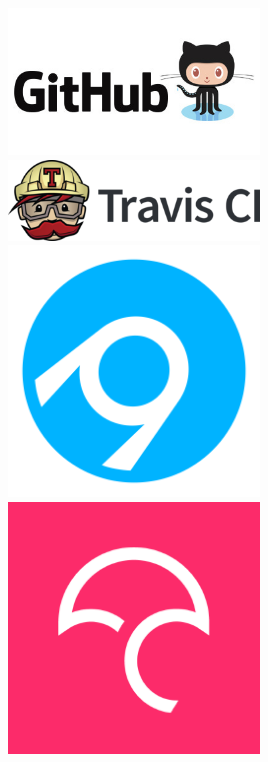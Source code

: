 \documentclass[trans]{beamer}
\begin{document}
{  \begin{minipage}{1\textwidth}
  \begin{columns}
  \includegraphics[width=0.5\textwidth]{figures/github-logo.jpg}\\
  \includegraphics[width=0.5\textwidth]{figures/travisci-logo.png}\\
  \includegraphics[width=0.5\textwidth]{figures/appveyor-logo-256.png}\\
  \includegraphics[width=0.5\textwidth]{figures/codecov-logo.png}\\

\end{columns}
\end{minipage}}
\end{document}
